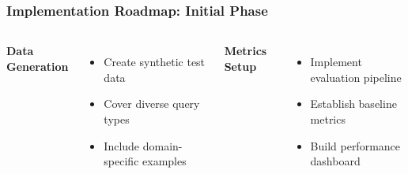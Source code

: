 
\begin{frame}
    \frametitle{Implementation Roadmap: Initial Phase}
    
    \begin{center}
    \end{center}
    
    \begin{columns}
        \textbf{Data Generation}
        \begin{itemize}
            \item Create synthetic test data
            \item Cover diverse query types
            \item Include domain-specific examples
        \end{itemize}
        
        \textbf{Metrics Setup}
        \begin{itemize}
            \item Implement evaluation pipeline
            \item Establish baseline metrics
            \item Build performance dashboard
        \end{itemize}
    \end{columns}
\end{frame}

